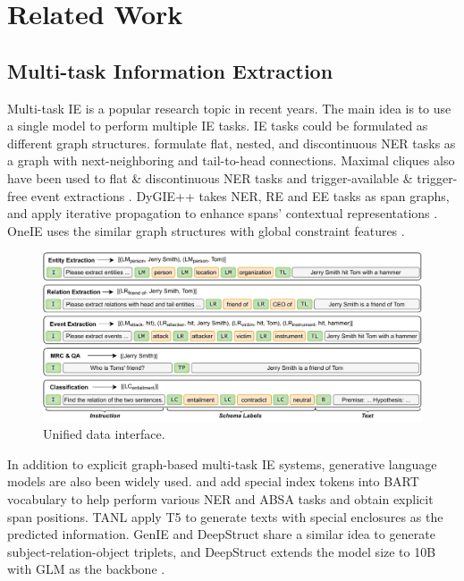 \section{Related Work}

\subsection{Multi-task Information Extraction}

Multi-task IE is a popular research topic in recent years.
The main idea is to use a single model to perform multiple IE tasks.
IE tasks could be formulated as different graph structures.
\citet{w2ner} formulate flat, nested, and discontinuous NER tasks as a graph with next-neighboring and tail-to-head connections.
Maximal cliques also have been used to flat \& discontinuous NER tasks \cite{mac-discontinuous-ner} and trigger-available \& trigger-free event extractions \cite{ptpcg}.
DyGIE++ takes NER, RE and EE tasks as span graphs, and apply iterative propagation to enhance spans' contextual representations \cite{dygiepp}.
OneIE uses the similar graph structures with global constraint features \cite{oneie}.

\begin{figure}[t]
    \centering
    \includegraphics[width=\textwidth]{figs/inputs.pdf}
    \caption{Unified data interface.}
    \label{fig:unified-data-interface}
\end{figure}

In addition to explicit graph-based multi-task IE systems, generative language models are also been widely used.
\citet{bart-ner} and \citet{bart-absa} add special index tokens into BART \cite{bart} vocabulary to help perform various NER and ABSA tasks and obtain explicit span positions.
TANL \cite{tanl} apply T5 \cite{t5} to generate texts with special enclosures as the predicted information.
GenIE \cite{genie} and DeepStruct \cite{deepstruct} share a similar idea to generate subject-relation-object triplets, and DeepStruct extends the model size to 10B with GLM as the backbone \cite{glm}.

